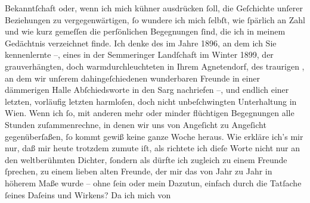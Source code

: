                Bekanntſchaft oder, wenn ich mich kühner ausdrücken{ }ſoll, die Geſchichte unſerer
               Beziehungen zu vergegenwärtigen,{ }ſo wundere ich mich{ }ſelbſt, wie{ }ſpärlich an Zahl und
               wie kurz gemeſſen die perſönlichen Begegnungen{ }ſind, die ich in meinem Gedächtnis
               verzeichnet finde. Ich denke des \label{K_L02377-2v}\label{K_L02377-2} im Jahre 1896, an dem ich Sie kennenlernte –, eines \label{K_L02377-3v}\label{K_L02377-3} in der Semmeringer Landſchaft im
                  Winter 1899, der grauverhängten, doch warmdurchleuchteten \label{K_L02377-4v}\label{K_L02377-4} in Ihrem Agnetendorf, des traurigen
                  \label{K_L02377-5v}\label{K_L02377-5}, an dem wir unſerem dahingeſchiedenen wunderbaren Freunde in einer dämmerigen Halle
               Abſchiedsworte in den Sarg nachriefen –, und endlich einer letzten, vorläufig letzten
               harmloſen, doch nicht unbeſchwingten Unterhaltung in Wien. Wenn ich{ }ſo, mit anderen mehr oder minder flüchtigen Begegnungen alle
               Stunden zuſammenrechne, in denen wir uns von Angeſicht zu Angeſicht gegenüberſaßen,{ }ſo kommt gewiß keine ganze Woche heraus. Wie erkläre ich’s mir nur, daß mir heute
               trotzdem zumute iſt, als richtete ich dieſe Worte nicht nur an den weltberühmten
               Dichter,{ }ſondern als dürfte ich zugleich zu einem Freunde{ }ſprechen, zu einem lieben
               alten Freunde, der mir das von Jahr zu Jahr in höherem Maße wurde – ohne{ }ſein oder
               mein Dazutun, einfach durch die Tatſache{ }ſeines Daſeins und Wirkens? Da ich mich von
